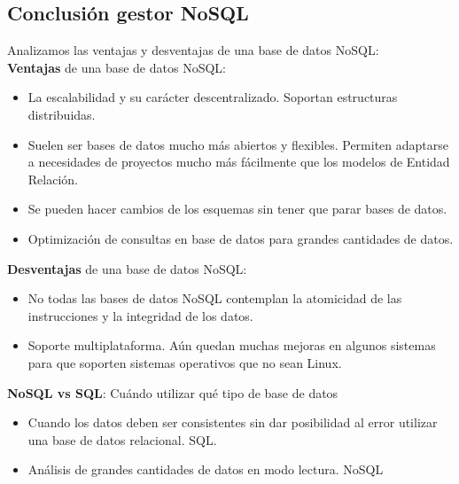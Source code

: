 \documentclass[12pt,a4paper]{article}
\begin{document}


\subsection{Conclusión gestor NoSQL}  \label{pto53}


Analizamos las ventajas y desventajas de una base de datos NoSQL:\\

\textbf{Ventajas} de una base de datos NoSQL:
\begin{itemize}
\item	La escalabilidad y su carácter descentralizado. Soportan estructuras distribuidas.
\item	Suelen ser bases de datos mucho más abiertos y flexibles. Permiten adaptarse a necesidades de proyectos mucho más fácilmente que los modelos de Entidad Relación.
\item	Se pueden hacer cambios de los esquemas sin tener que parar bases de datos.
\item	Optimización de consultas en base de datos para grandes cantidades de datos.
\end{itemize}

\textbf{Desventajas} de una base de datos NoSQL:

\begin{itemize}
\item No todas las bases de datos NoSQL contemplan la atomicidad de las instrucciones y la integridad de los datos. 
\item Soporte multiplataforma. Aún quedan muchas mejoras en algunos sistemas para que soporten sistemas operativos que no sean Linux.
\end{itemize}



\textbf{NoSQL vs SQL}: Cuándo utilizar qué tipo de base de datos
\begin{itemize}
\item	Cuando los datos deben ser consistentes sin dar posibilidad al error utilizar una base de datos relacional. SQL.
\item	Análisis de grandes cantidades de datos en modo lectura. NoSQL
\end{itemize}




\newpage
\end{document}
